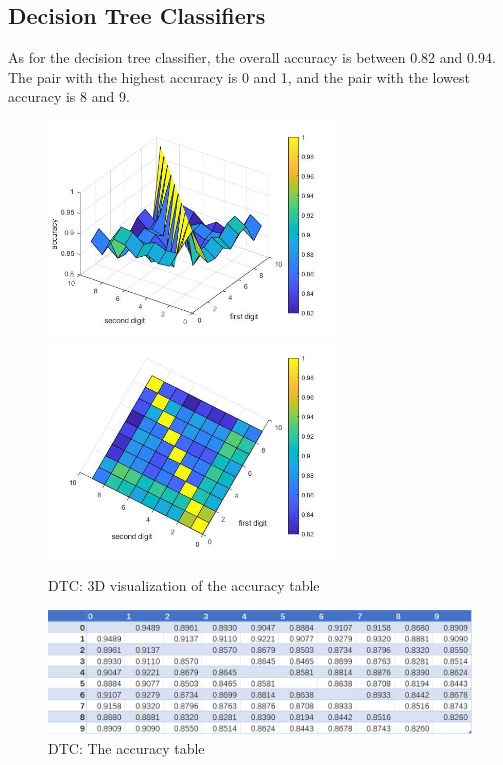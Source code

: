 \documentclass{article}
\begin{document}
\subsection{Decision Tree Classifiers}
As for the decision tree classifier, the overall accuracy is between 0.82 and 0.94. The pair with the highest accuracy is 0 and 1, and the pair with the lowest accuracy is 8 and 9.
\begin{figure}[h]
    \centerline{\includegraphics[width=3in]{surf3.jpg}\includegraphics[width=3in]{surf4.jpg}}
    \caption{DTC: 3D visualization of the accuracy table}
\end{figure}
\begin{figure}[h]
    \centerline{\includegraphics[width=6in]{DTCtable.PNG}}
    \caption{DTC: The accuracy table}
\end{figure}

\newpage
\end{document}
